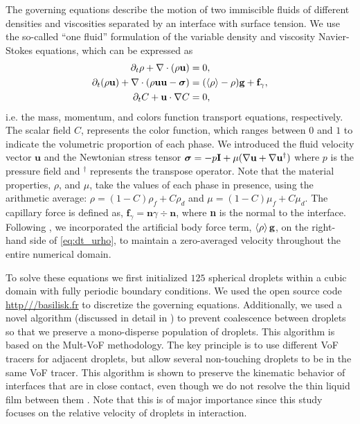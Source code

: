 The governing equations describe the motion of two immiscible fluids of different densities and viscosities separated by an interface with surface tension. 
We use the so-called ``one fluid'' formulation of the variable density and viscosity Navier-Stokes equations, which can be expressed as 
\begin{align}
    \pddt \rho+ \div(\rho\textbf{u})
    &= 0,\\
    \label{eq:dt_urho}
    \pddt (\rho \textbf{u})
    + \div (\rho  \textbf{u} \textbf{u} - \bm\sigma)
    &= (\avg{\rho} - \rho)\textbf{g}
    + \textbf{f}_\gamma,\\
    \label{eq:dt_C}
    \pddt C + \textbf{u}\cdot\grad C  
    &= 0,
\end{align}
i.e. the mass, momentum, and colors function transport equations, respectively. 
The scalar field $C$, represents the color function, which ranges between $0$ and $1$ to indicate the volumetric proportion of each phase.
We introduced the fluid velocity vector $\textbf{u}$ and the Newtonian stress tensor $\bm{\sigma} = -p \textbf{I} + \mu (\mathbf{\nabla} \textbf{u}+ \mathbf{\nabla} \textbf{u}^\dagger)$ where $p$ is the pressure field and $^\dagger$ represents the transpose operator.
Note that the material properties, $\rho$, and $\mu$, take the values of each phase in presence, using the arithmetic average: $\rho = (1-C)\rho_f + C \rho_d$ and $\mu = (1-C)\mu_f + C \mu_d$. 
The capillary force is defined as, $\textbf{f}_\gamma =\textbf{n} \gamma \div \textbf{n} $, where \textbf{n} is the normal to the interface.
Following  \citep{bunner2002dynamics}, we incorporated the artificial body force term, $\left<\rho\right>\textbf{g}$, on the right-hand side of \ref{eq:dt_urho}, to maintain a zero-averaged velocity throughout the entire numerical domain.  

To solve these equations we first initialized $125$ spherical droplets within a cubic domain with fully periodic boundary conditions. 
We used the open source code \url{http///basilisk.fr} to discretize the governing equations. 
Additionally, we used a novel algorithm (discussed in detail in \citep{mani2021numerical,fintzi2024buoyancy}) to prevent coalescence between droplets so that we preserve a mono-disperse population of droplets. 
This algorithm is based on the Mult-VoF methodology. 
The key principle is to use different VoF tracers for adjacent droplets, but allow several non-touching droplets to be in the same VoF tracer.
This algorithm is shown to preserve the kinematic behavior of interfaces that are in close contact, even though we do not resolve the thin liquid film between them \citep{fintzi2024buoyancy}. 
Note that this is of major importance since this study focuses on the relative velocity of droplets in interaction. 

